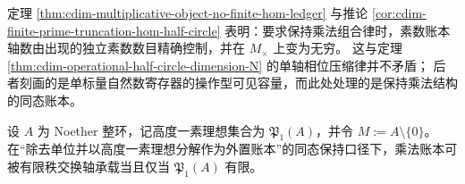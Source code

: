 \begin{remark}[单标量实现与精确乘法的分离]\label{rem:cdim-hom-half-circle-vs-operational}
定理 \ref{thm:cdim-multiplicative-object-no-finite-hom-ledger} 与推论 \ref{cor:cdim-finite-prime-truncation-hom-half-circle}
表明：要求保持乘法组合律时，素数账本轴数由出现的独立素数数目精确控制，并在 \(M_\times\) 上变为无穷。
这与定理 \ref{thm:cdim-operational-half-circle-dimension-N} 的单轴相位压缩律并不矛盾；
后者刻画的是单标量自然数寄存器的操作型可见容量，而此处处理的是保持乘法结构的同态账本。
\end{remark}

\begin{conjecture}[高度一素理想有限性与乘法账本的有限化]\label{conj:height-one-prime-ledger-finiteness}
设 \(A\) 为 Noether 整环，记高度一素理想集合为 \(\mathfrak P_1(A)\)，并令 \(M:=A\setminus\{0\}\)。
在“除去单位并以高度一素理想分解作为外置账本”的同态保持口径下，乘法账本可被有限秩交换轴承载当且仅当 \(\mathfrak P_1(A)\) 有限。
\end{conjecture}

\endinput
